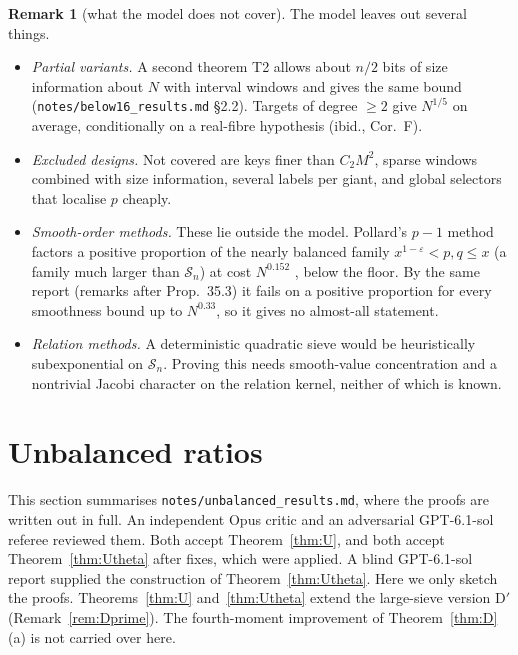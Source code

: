 \documentclass[11pt]{amsart}
\theoremstyle{definition}
\newtheorem{remark}[theorem]{Remark}
\newcommand{\Sn}{\mathcal{S}_n}
\begin{document}
\begin{remark}[what the model does not cover]\label{rem:T1scope}
The model leaves out several things.
\begin{itemize}
\item \emph{Partial variants.} A second theorem T2 allows about $n/2$ bits of size information
  about $N$ with interval windows and gives the same bound (\texttt{notes/below16\_results.md}
  \S2.2). Targets of degree $\ge2$ give $N^{1/5}$ on average, conditionally on a real-fibre
  hypothesis (ibid., Cor.~F).
\item \emph{Excluded designs.} Not covered are keys finer than $C_2M^2$, sparse windows combined
  with size information, several labels per giant, and global selectors that localise $p$
  cheaply.
\item \emph{Smooth-order methods.} These lie outside the model. Pollard's $p-1$ method factors a
  positive proportion of the nearly balanced family $x^{1-\varepsilon}<p,q\le x$ (a family much
  larger than $\Sn$) at cost $N^{0.152}$
  \cite[Prop.~35.3]{wardmaestro2026}, below the floor. By the same report (remarks after
  Prop.~35.3) it fails on a positive proportion for every smoothness bound up to $N^{0.33}$, so it
  gives no almost-all statement.
\item \emph{Relation methods.} A deterministic quadratic sieve would be heuristically
  subexponential on $\Sn$. Proving this needs smooth-value concentration and a nontrivial Jacobi
  character on the relation kernel, neither of which is known.
\end{itemize}
\end{remark}

\section{Unbalanced ratios}\label{sec:unbalanced}

This section summarises \texttt{notes/unbalanced\_results.md}, where the proofs are written out
in full. An independent Opus critic and an adversarial GPT-6.1-sol referee reviewed them. Both
accept Theorem~\ref{thm:U}, and both accept Theorem~\ref{thm:Utheta} after fixes, which were
applied. A blind GPT-6.1-sol report supplied the construction of Theorem~\ref{thm:Utheta}. Here we
only sketch the proofs. Theorems~\ref{thm:U} and~\ref{thm:Utheta} extend the large-sieve version
D$'$ (Remark~\ref{rem:Dprime}). The fourth-moment improvement of Theorem~\ref{thm:D}(a) is not
carried over here.
\end{document}

